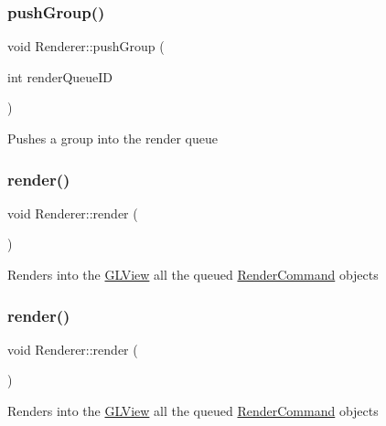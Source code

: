 \subsubsection{\texorpdfstring{push\+Group()}{pushGroup()}\hspace{0.1cm}{\footnotesize\ttfamily [2/2]}}
{\footnotesize\ttfamily void Renderer\+::push\+Group (\begin{DoxyParamCaption}\item[{int}]{render\+Queue\+ID }\end{DoxyParamCaption})}

Pushes a group into the render queue \mbox{\label{classRenderer_af7e5f8f68742f198e315fb4683a605a4}} 
\subsubsection{\texorpdfstring{render()}{render()}\hspace{0.1cm}{\footnotesize\ttfamily [1/2]}}
{\footnotesize\ttfamily void Renderer\+::render (\begin{DoxyParamCaption}{ }\end{DoxyParamCaption})}

Renders into the \hyperlink{classGLView}{G\+L\+View} all the queued {\ttfamily \hyperlink{classRenderCommand}{Render\+Command}} objects \mbox{\label{classRenderer_af7e5f8f68742f198e315fb4683a605a4}} 
\subsubsection{\texorpdfstring{render()}{render()}\hspace{0.1cm}{\footnotesize\ttfamily [2/2]}}
{\footnotesize\ttfamily void Renderer\+::render (\begin{DoxyParamCaption}{ }\end{DoxyParamCaption})}

Renders into the \hyperlink{classGLView}{G\+L\+View} all the queued {\ttfamily \hyperlink{classRenderCommand}{Render\+Command}} objects \mbox{\label{classRenderer_ac098692bd1bad4e15176c9a95c6e1183}} 
